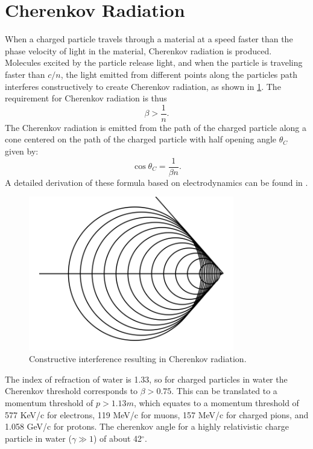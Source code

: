 \section{Cherenkov Radiation}
\label{ch:cherenkov_radtion}
When a charged particle travels through a material at a speed faster than the phase velocity of light in the material, Cherenkov radiation is produced.  Molecules excited by the particle release light, and when the particle is traveling faster than $c/n$, the light emitted from different points along the particles path interferes constructively to create Cherenkov radiation, as shown in \cref{fig:cherenkovradiation}.  The requirement for Cherenkov radiation is thus
\begin{equation}
\beta>\frac{1}{n}.
\label{eq:cherenkov_req}
\end{equation}
The Cherenkov radiation is emitted from the path of the charged particle along a cone centered on the path of the charged particle with half opening angle $\theta_C$ given by:
\begin{equation}
\cos \theta_C=\frac{1}{\beta n}.
\label{eq:cherenkov_angle}
\end{equation}
A detailed derivation of these formula based on electrodynamics can be found in \cite{Jackson:1998nia}.\par
\begin{figure}
\centering
\includegraphics[width=0.8\textwidth]{figures/Cherenkov_radiation.png}
\caption{Constructive interference resulting in Cherenkov radiation.}
\label{fig:cherenkovradiation}
\end{figure}
The index of refraction of water is 1.33, so for charged particles in water the Cherenkov threshold corresponds to $\beta>0.75$.  This can be translated to a momentum threshold of $p>1.13m$, which equates to a momentum threshold of 577 KeV/c for electrons, 119 MeV/c for muons, 157 MeV/c for charged pions, and 1.058 GeV/c for protons.  The cherenkov angle for a highly relativistic charge particle in water ($\gamma \gg 1$) of about 42$^\circ$.  \par
